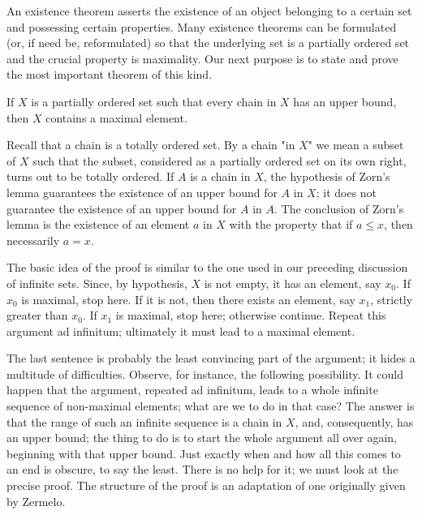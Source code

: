 
An existence theorem asserts the existence of an object belonging to a certain set and possessing certain properties. Many existence theorems can be formulated (or, if need be, reformulated) so that the underlying set is a partially ordered set and the crucial property is maximality. Our next purpose is to state and prove the most important theorem of this kind.

\begin{named} If $X$ is a partially ordered set such that every chain in $X$ has an upper bound, then $X$ contains a maximal element. 
\end{named}

\subtitle{Discussion} Recall that a chain is a totally ordered set. By a chain "in $X$" we mean a subset of $X$ such that the subset, considered as a partially ordered set on its own right, turns out to be totally ordered. If $A$ is a chain in $X$, the hypothesis of Zorn's lemma guarantees the existence of an upper bound for $A$ in $X$; it does not guarantee the existence of an upper bound for $A$ in $A$. The conclusion of Zorn's lemma is the existence of an element $a$ in $X$ with the property that if $a \le x$, then necessarily $a = x$. 

The basic idea of the proof is similar to the one used in our preceding discussion of infinite sets. Since, by hypothesis, $X$ is not empty, it has an element, say $x_{0}$. If $x_{0}$ is maximal, stop here. If it is not, then there exists an element, say $x_{1}$, strictly greater than $x_{0}$. If $x_{1}$ is maximal, stop here; otherwise continue. Repeat this argument ad infinitum; ultimately it must lead to a maximal element. 

The last sentence is probably the least convincing part of the argument; it hides a multitude of difficulties. Observe, for instance, the following possibility. It could happen that the argument, repeated ad infinitum, leads to a whole infinite sequence of non-maximal elements; what are we to do in that case? The answer is that the range of such an infinite sequence is a chain in $X$, and, consequently, has an upper bound; the thing to do is to start the whole argument all over again, beginning with that upper bound. Just exactly when and how all this comes to an end is obscure, to say the least. There is no help for it; we must look at the precise proof. The structure of the proof is an adaptation of one originally given by Zermelo. 

